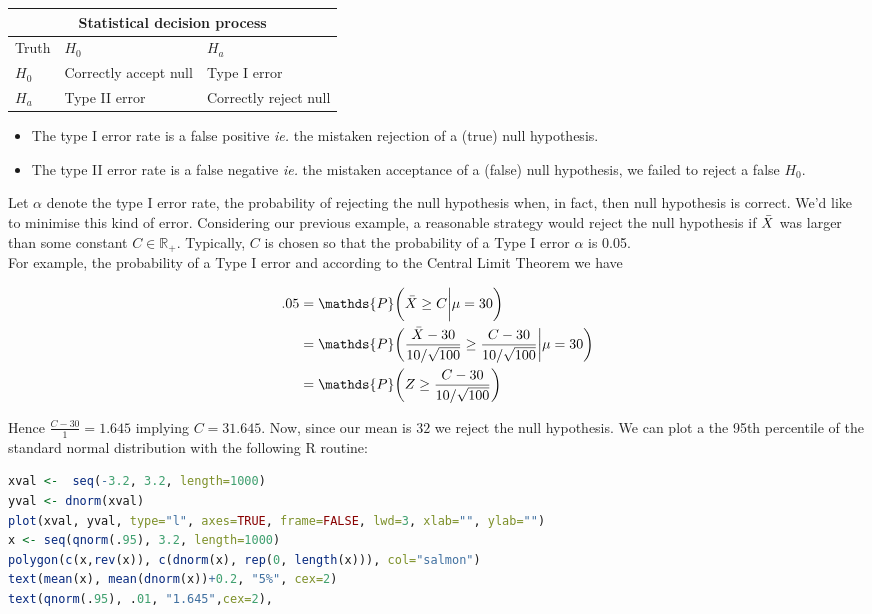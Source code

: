 \documentclass{homework}
\begin{document}
\begin{center}
\begin{tabular}{ |p{1cm}||p{5cm}|p{5cm}|  }
 \hline
 \multicolumn{3}{|c|}{Statistical decision process} \\
 \hline
 Truth& $H_0$ & $H_a$\\
 \hline
 $H_0$  & Correctly accept null & Type I error\\
 $H_a$ &  Type II error & Correctly reject null\\
 \hline
\end{tabular}
\end{center}

\begin{itemize}
    \item The type I error rate is a false positive \textit{ie.} the mistaken rejection of a (true) null hypothesis. 
    \item The type II error rate is a false negative \textit{ie.} the mistaken acceptance of a (false) null hypothesis, we failed to reject a false $H_0$.
\end{itemize}

Let $\alpha$ denote the type I error rate, the probability of rejecting the null hypothesis when, in fact, then null hypothesis is correct. We'd like to minimise this kind of error. Considering our previous example, a reasonable strategy would reject the null hypothesis if $\Bar{X}$ was larger than some constant $C \in \mathds{R}_{+}$. Typically, $C$ is chosen so that the probability of a Type I error $\alpha$ is 0.05. \\

For example, the probability of a Type I error and according to the Central Limit Theorem we have  

\begin{align*}
        .05 &= \mathds{P}\bigg(\Bar{X}\geq C \bigg| \mu = 30 \bigg) \\
        &=\mathds{P}\bigg(\frac{\Bar{X}-30}{10/\sqrt{100}}\geq \frac{C-30}{10/\sqrt{100}} \bigg| \mu = 30 \bigg) \\
        &= \mathds{P}\bigg(Z\geq \frac{C-30}{10/\sqrt{100}}\bigg)
\end{align*}

Hence $\frac{C-30}{1}=1.645$ implying $C=31.645$. Now, since our mean is $32$ we reject the null hypothesis. We can plot a the 95th percentile of the standard normal distribution with the following R routine:

\clearpage

\begin{lstlisting}[language=R]
xval <-  seq(-3.2, 3.2, length=1000)
yval <- dnorm(xval)
plot(xval, yval, type="l", axes=TRUE, frame=FALSE, lwd=3, xlab="", ylab="")
x <- seq(qnorm(.95), 3.2, length=1000)
polygon(c(x,rev(x)), c(dnorm(x), rep(0, length(x))), col="salmon")
text(mean(x), mean(dnorm(x))+0.2, "5%", cex=2)
text(qnorm(.95), .01, "1.645",cex=2),
\end{lstlisting} 
\end{document}
